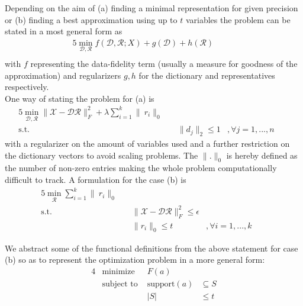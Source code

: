 \documentclass{article}
\newcommand{\R}{\mathbb{R}}
\DeclareMathOperator*{\argmin}{\arg\!\min}
\begin{document}
\noindent Depending on the aim of (a) finding a minimal representation for given precision or (b) finding a best approximation using up to $t$ variables the problem can be stated in a most general form as
\begin{alignat*}{5}
          \min_{\mathcal{D}, \mathcal{R}}  f(\mathcal{D}, \mathcal{R}; X) + g(\mathcal{D}) + h(\mathcal{R})      & \quad  & \\
\end{alignat*}
with $f$ representing the data-fidelity term (usually a measure for goodness of the approximation) and regularizers $g, h$ for the dictionary and representatives respectively.
\\
One way of stating the problem for (a) is
\begin{alignat}{5}
          \min_{\mathcal{D}, \mathcal{R}} \|\mathcal{X}-\mathcal{D}\mathcal{R}\|_F^2  + \lambda \sum_{i=1}^k  \|\ r_i\|_0    & \quad  & \\
         \text{s.t.} & \quad  \|d_j\|_2 \leq 1&, \forall j=1, ...,n & \quad 
\end{alignat}
with a regularizer on the amount of variables used and a further restriction on the dictionary vectors to avoid scaling problems. The $\| .\|_0$ is hereby defined as the number of non-zero entries making the whole problem computationally difficult to track\cite{NPHardproof}. A formulation for the case (b) is 
\begin{alignat}{5}
          \min_{\mathcal{R}} \sum_{i=1}^k  \|\ r_i\|_0    & \quad  & \\
         \text{s.t.} & \quad  \|\mathcal{X}-\mathcal{D}\mathcal{R}\|_F^2 \leq \epsilon & & \quad \\
          & \quad  \| r_i \|_0 \leq t  &, \forall i=1, ..., k & \quad 
\end{alignat}


\noindent We abstract some of the functional definitions from the above statement for case (b) so as to represent the optimization problem in a more general form:
\begin{alignat*}{4}
    &\text{minimize }   & F(a) & \\
    &\text{subject to } & \text{support}(a)&\subseteq S\\
    &                   & |S|  &\leq t\\
\end{alignat*}
	
\end{document}
